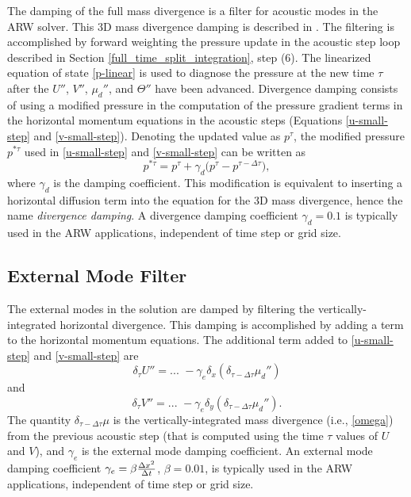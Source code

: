 The damping of the full mass divergence is a filter for acoustic
modes in the ARW solver.  This 3D mass divergence damping is described
in \citet{skamarock92}.  The filtering is accomplished by
forward weighting the pressure update in the acoustic step loop
described in Section \ref{full_time_split_integration}, step (6).  The linearized equation of
state \eqref{p-linear} is used to diagnose the pressure at the new time $\tau$
after the $U''$, $V''$, $\mu_d''$, and $\Theta''$ have
been advanced.  Divergence damping consists of using a modified pressure
in the computation of the pressure gradient terms in the horizontal
momentum equations in the acoustic steps (Equations \eqref{u-small-step}
and \eqref{v-small-step}).  Denoting the updated value as $p^\tau$, 
the modified pressure $p^{*\tau}$ used in \eqref{u-small-step}
and \eqref{v-small-step}
can be written as
%
\begin{equation}
p^{*\tau} = 
{p}^{\tau} + \gamma_d \bigl(
{p}^{\tau} -
{p}^{\tau - \Delta \tau}
\bigr),
\end{equation}
%
\noindent
where $\gamma_d$ is the damping coefficient.  
This modification is equivalent to inserting a horizontal 
diffusion term into the equation for the 3D mass divergence,
hence the name {\em divergence damping}.
A divergence damping coefficient $\gamma_d = 0.1$ is
typically used in the ARW
applications, independent of time step or grid size.

\subsection{External Mode Filter}

The external modes in the solution are damped by filtering
the vertically-integrated horizontal divergence.
This damping is accomplished by
adding a term to the horizontal momentum equations.  The additional
term added to \eqref{u-small-step} and \eqref{v-small-step} are
%
\begin{equation}
\delta_\tau U'' = ... \,\,
- \gamma_e \delta_x (\delta_{\tau-\Delta \tau} \mu_d'')
\end{equation}
\noindent 
and
\begin{equation}
\delta_\tau V'' = ... \,\, 
- \gamma_e \delta_y (\delta_{\tau-\Delta \tau} \mu_d'').
\end{equation}
%
\noindent
The quantity $\delta_{\tau - \Delta \tau} \mu $ is the vertically-integrated 
mass divergence (i.e., \eqref{omega}) from the previous
acoustic step (that is computed using
the time $\tau$ values of $U$ and $V$), and
$\gamma_e$ is the external mode damping coefficient.  An external mode
damping coefficient $\gamma_e = \beta{\Delta x^2\over \Delta t}$,  
$\beta = 0.01$, is typically used in the ARW
applications, independent of time step or grid size.

